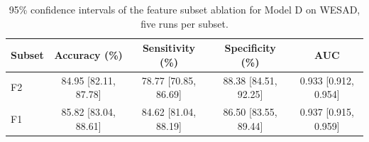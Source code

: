 \begin{table}[h!]
\centering
\footnotesize
\begin{tabular}{|l|c|c|c|c|}
\hline
\textbf{Subset} & \textbf{Accuracy (\%)} & \textbf{Sensitivity (\%)} & \textbf{Specificity (\%)} & \textbf{AUC} \\ \hline
F2 & 84.95 [82.11, 87.78] & 78.77 [70.85, 86.69] & 88.38 [84.51, 92.25] & 0.933 [0.912, 0.954] \\ \hline
F1 & 85.82 [83.04, 88.61] & 84.62 [81.04, 88.19] & 86.50 [83.55, 89.44] & 0.937 [0.915, 0.959] \\ \hline
\end{tabular}
\caption{95\% confidence intervals of the feature subset ablation for Model D on WESAD, five runs per subset.}
\label{tab:ci_ablation}
\end{table}
